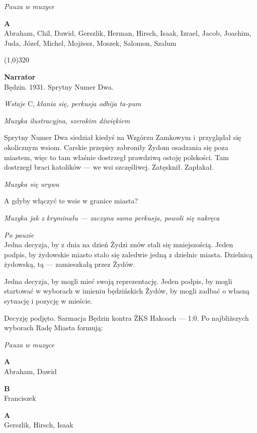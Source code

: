 \documentclass[11pt,a4paper,oneside]{article}
\begin{document}
{\color{light-gray} \emph{Pauza w muzyce}}

\textbf{A}\\
Abraham, Chil, Dawid, Gerszlik, Herman, Hirsch, Isaak, Izrael, Jacob, Joachim, Juda, Józef, Michel, Mojżesz, Moszek, Salomon, Szalum

\line(1,0){320}

 
\textbf{Narrator}\\
Będzin. 1931. Sprytny Numer Dwa. 

{\color{light-gray} \emph{Wstaje} C, \emph{kłania się, perkusja odbija
ta-pum}}

{\color{light-gray} \emph{Muzyka ilustracyjna, szerokim dźwiękiem}}

Sprytny Numer Dwa siedział kiedyś na Wzgórzu Zamkowym i~przyglądał się
okolicznym wsiom. Carskie przepisy zabroniły Żydom osadzania się poza
miastem, więc to tam właśnie dostrzegł prawdziwą ostoję polskości. Tam
dostrzegł braci katolików --- we wsi szczęśliwej. Zatęsknił. Zapłakał.

{\color{light-gray} \emph{Muzyka się urywa}}

A gdyby włączyć te wsie w granice miasta?

{\color{light-gray} \emph{Muzyka jak z kryminału --- zaczyna sama
perkusja, powoli się nakręca}}

{\color{light-gray} \emph{Po pauzie}}\\
Jedna decyzja, by z dnia na dzień Żydzi znów stali się mniejszością.
Jeden podpis, by żydowskie miasto stało się zaledwie jedną z dzielnic
miasta.  Dzielnicą żydowską, tą --- zamieszkałą przez Żydów. 

Jedna decyzja, by mogli mieć swoją reprezentację. Jeden podpis, by
mogli startować w wyborach w imieniu będzińskich Żydów, by mogli
zadbać o własną sytuację i pozycję w mieście. 

Decyzję podjęto. Sarmacja Będzin kontra ŻKS Hakoach --- 1:0. Po
najbliższych wyborach Radę Miasta formują:

{\color{light-gray} \emph{Pauza w muzyce}}

\textbf{A}\\
Abraham, Dawid

\textbf{B}\\
Franciszek

\textbf{A}\\
Gerszlik, Hirsch, Isaak
\end{document}
